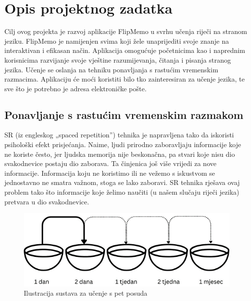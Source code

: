 \chapter{Opis projektnog zadatka}
	
Cilj ovog projekta je razvoj aplikacije FlipMemo u svrhu učenja riječi na stranom jeziku. 
FlipMemo je namijenjen svima koji žele unaprijediti svoje znanje na interaktivan i efikasan način. 
Aplikacija omogućuje početnicima kao i naprednim korisnicima razvijanje svoje vještine razumijevanja, 
čitanja i pisanja stranog jezika. Učenje se oslanja na tehniku ponavljanja s rastućim vremenskim razmacima. 
Aplikaciju će moći koristiti bilo tko zainteresiran za učenje jezika, te sve što je potrebno je adresa elektroničke pošte.

\section{Ponavljanje s rastućim vremenskim razmakom}

SR (iz engleskog „spaced repetition”) tehnika je napravljena tako da iskoristi psihološki efekt prisjećanja. 
Naime, ljudi prirodno zaboravljaju informacije koje ne koriste često, jer ljudska memorija nije beskonačna, 
pa stvari koje nisu dio svakodnevice postaju dio zaborava. Ta činjenica još više vrijedi za nove informacije. 
Informacija koju ne koristimo ili ne vežemo s iskustvom se jednostavno ne smatra važnom, stoga se lako zaboravi. 
SR tehnika rješava ovaj problem tako što informacije koje želimo naučiti (u našem slučaju riječi jezika) pretvara u dio svakodnevice.

\begin{figure}[H]
	\includegraphics[scale=0.8]{slike/spaced_repetition.png} 
	\centering
	\caption{Ilustracija sustava za učenje s pet posuda}
	\label{fig:spacedrepetition}
\end{figure}


